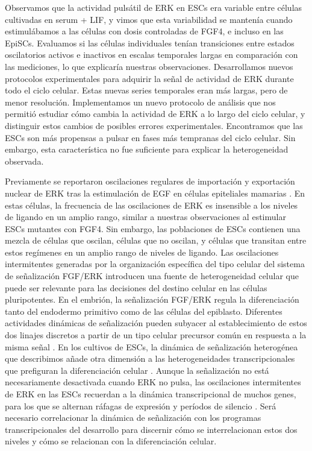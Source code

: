 \documentclass[./main.tex]{subfiles}
\begin{document}
Observamos que la actividad pulsátil de ERK en ESCs era variable entre células cultivadas en serum + LIF, y vimos que esta variabilidad se mantenía cuando estimulábamos a las células con dosis controladas de FGF4, e incluso en las EpiSCs. Evaluamos si las células individuales tenían transiciones entre estados oscilatorios activos e inactivos en escalas temporales largas en comparación con las mediciones, lo que explicaría nuestras observaciones. Desarrollamos nuevos protocolos experimentales para adquirir la señal de actividad de ERK durante todo el ciclo celular. Estas nuevas series temporales eran más largas, pero de menor resolución. Implementamos un nuevo protocolo de análisis que nos permitió estudiar cómo cambia la actividad de ERK a lo largo del ciclo celular, y distinguir estos cambios de posibles errores experimentales. Encontramos que las ESCs son más propensas a pulsar en fases más tempranas del ciclo celular. Sin embargo, esta característica no fue suficiente para explicar la heterogeneidad observada. 


Previamente se reportaron oscilaciones regulares de importación y exportación nuclear de ERK tras la estimulación de EGF en células epiteliales mamarias \cite{Shankaran2009}. En estas células, la frecuencia de las oscilaciones de ERK es insensible a los niveles de ligando en un amplio rango, similar a nuestras observaciones al estimular ESCs mutantes con FGF4. Sin embargo, las poblaciones de ESCs contienen una mezcla de células que oscilan, células que no oscilan, y células que transitan entre estos regímenes en un amplio rango de niveles de ligando. Las oscilaciones intermitentes generadas por la organización específica del tipo celular del sistema de señalización FGF/ERK introducen una fuente de heterogeneidad celular que puede ser relevante para las decisiones del destino celular en las células pluripotentes. En el embrión, la señalización FGF/ERK regula la diferenciación tanto del endodermo primitivo como de las células del epiblasto. Diferentes actividades dinámicas de señalización pueden subyacer al establecimiento de estos dos linajes discretos a partir de un tipo celular precursor común en respuesta a la misma señal \cite{Pokrass2020}. En los cultivos de ESCs, la dinámica de señalización heterogénea que describimos añade otra dimensión a las heterogeneidades transcripcionales que prefiguran la diferenciación celular \cite{Canham2010,Chambers2007,Hayashi2008,Singh2007,Toyooka2008}. Aunque la señalización no está necesariamente desactivada cuando ERK no pulsa, las oscilaciones intermitentes de ERK en las ESCs recuerdan a la dinámica transcripcional de muchos genes, para los que se alternan ráfagas de expresión y períodos de silencio \cite{Tunnacliffe2020}. Será necesario correlacionar la dinámica de señalización con los programas transcripcionales del desarrollo para discernir cómo se interrelacionan estos dos niveles y cómo se relacionan con la diferenciación celular.
\end{document}
